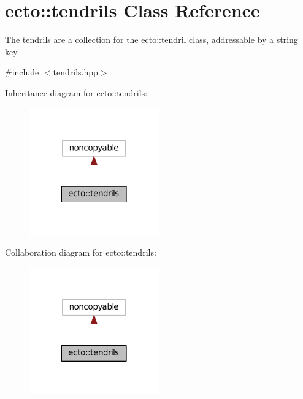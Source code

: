 \hypertarget{classecto_1_1tendrils}{\section{ecto\-:\-:tendrils Class Reference}
\label{classecto_1_1tendrils}
}


The tendrils are a collection for the \hyperlink{classecto_1_1tendril}{ecto\-::tendril} class, addressable by a string key.  




{\ttfamily \#include $<$tendrils.\-hpp$>$}



Inheritance diagram for ecto\-:\-:tendrils\-:\nopagebreak
\begin{figure}[H]
\begin{center}
\leavevmode
\includegraphics[width=158pt]{classecto_1_1tendrils__inherit__graph}
\end{center}
\end{figure}


Collaboration diagram for ecto\-:\-:tendrils\-:\nopagebreak
\begin{figure}[H]
\begin{center}
\leavevmode
\includegraphics[width=158pt]{classecto_1_1tendrils__coll__graph}
\end{center}
\end{figure}
